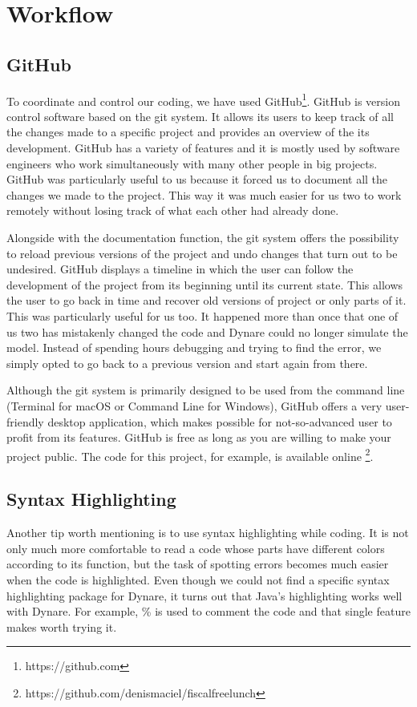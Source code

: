\section{Workflow}

\subsection*{GitHub}
\label{sub:GitHub}

To coordinate and control our coding, we have used GitHub\footnote{https://github.com}. GitHub is version control software based on the git system. It allows its users to keep track of all the changes made to a specific project and provides an overview of the its development. GitHub has a variety of features and it is mostly used by software engineers who work simultaneously with many other people in big projects. GitHub was particularly useful to us because it forced us to document all the changes we made to the project. This way it was much easier for us two to work remotely without losing track of what each other had already done.

Alongside with the documentation function, the git system offers the possibility to reload previous versions of the project and undo changes that turn out to be undesired. GitHub displays a timeline in which the user can follow the development of the project from its beginning until its current state. This allows the user to go back in time and recover old versions of project or only parts of it. This was particularly useful for us too. It happened more than once that one of us two has mistakenly changed the code and Dynare could no longer simulate the model. Instead of spending hours debugging and trying to find the error, we simply opted to go back to a previous version and start again from there.

Although the git system is primarily designed to be used from the command line (Terminal for macOS or Command Line for Windows), GitHub offers a very user-friendly desktop application, which makes possible for not-so-advanced user to profit from its features. GitHub is free as long as you are willing to make your project public. The code for this project, for example, is available online \footnote{https://github.com/denismaciel/fiscalfreelunch}.


\subsection*{Syntax Highlighting}
\label{sub:Syntax Highlighting}

Another tip worth mentioning is to use syntax highlighting while coding. It is not only much more comfortable to read a code whose parts have different colors according to its function, but the task of spotting errors becomes much easier when the code is highlighted. Even though we could not find a specific syntax highlighting package for Dynare, it turns out that Java's highlighting works well with Dynare. For example, \% is used to comment the code and that single feature makes worth trying it.
